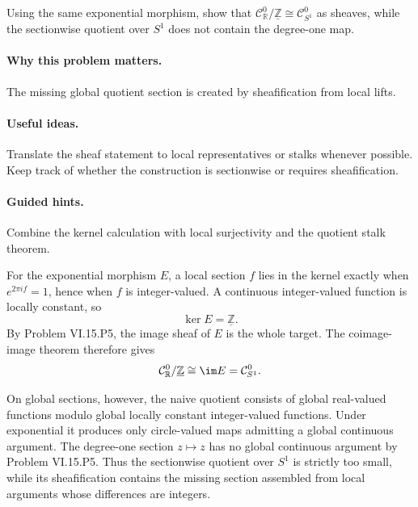\begin{problem}\label{prob:vi15-p6}
Using the same exponential morphism, show that $\mathcal C^0_{\mathbb R}/\underline{\mathbb Z}\cong\mathcal C^0_{S^1}$ as sheaves, while the sectionwise quotient over $S^1$ does not contain the degree-one map.
\end{problem}

\ifdefined\FullProblemDossiers
\paragraph{Why this problem matters.}
The missing global quotient section is created by sheafification from local lifts.

\paragraph{Useful ideas.}
Translate the sheaf statement to local representatives or stalks whenever possible.  Keep track of whether the construction is sectionwise or requires sheafification.

\paragraph{Guided hints.}
Combine the kernel calculation with local surjectivity and the quotient stalk theorem.

\begin{solution}
For the exponential morphism $E$, a local section $f$ lies in the kernel exactly when $e^{2\pi if}=1$, hence when $f$ is integer-valued. A continuous integer-valued function is locally constant, so
\[
\ker E=\underline{\mathbb Z}.
\]
By Problem VI.15.P5, the image sheaf of $E$ is the whole target. The coimage-image theorem therefore gives
\[
\mathcal C^0_{\mathbb R}/\underline{\mathbb Z}
\cong
\im E
=
\mathcal C^0_{S^1}.
\]

On global sections, however, the naive quotient consists of global real-valued functions modulo global locally constant integer-valued functions. Under exponential it produces only circle-valued maps admitting a global continuous argument. The degree-one section $z\mapsto z$ has no global continuous argument by Problem VI.15.P5. Thus the sectionwise quotient over $S^1$ is strictly too small, while its sheafification contains the missing section assembled from local arguments whose differences are integers.
\end{solution}

